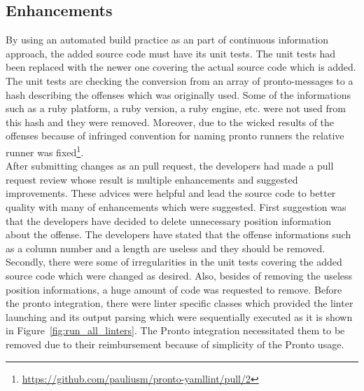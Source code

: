 \subsection{Enhancements}

By using an automated build practice as an part of continuous information approach, the added source code must have its unit tests. The unit tests had been replaced with the newer one covering the actual source code which is added. The unit tests are checking the conversion from an array of pronto-messages to a hash describing the offenses which was originally used. Some of the informations such as a ruby platform, a ruby version, a ruby engine, etc. were not used from this hash and they were removed. Moreover, due to the wicked results of the offenses because of infringed convention for naming pronto runners the relative runner was fixed\footnote{\url{https://github.com/pauliusm/pronto-yamllint/pull/2}}.\\

After submitting changes as an pull request, the developers had made a pull request review whose result is multiple enhancements and suggested improvements. These advices were helpful and lead the source code to better quality with many of enhancements which were suggested. First suggestion was that the developers have decided to delete unnecessary position information about the offense. The developers have stated that the offense informations such as a column number and a length are useless and they should be removed. Secondly, there were some of irregularities in the unit tests covering the added source code which were changed as desired. Also, besides of removing the useless position informations, a huge amount of code was requested to remove. Before the pronto integration, there were linter specific classes which provided the linter launching and its output parsing which were sequentially executed as it is shown in Figure~\ref{fig:run_all_linters}. The Pronto integration necessitated them to be removed due to their reimbursement because of simplicity of the Pronto usage.\\

